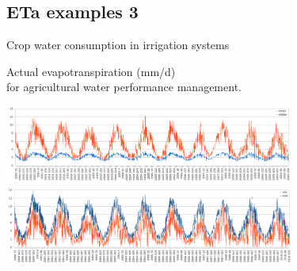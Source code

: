 \documentclass[xcolor=dvipsnames,beamer]{beamer} %
\begin{document}
\subsection{ETa examples 3}
\begin{frame}[fragile]{Crop water consumption in irrigation systems}

Actual evapotranspiration (mm/d)\\ 
for agricultural water performance management.\\

\begin{center}
 \includegraphics[width=9.5cm]{ciameanet}\\
 \includegraphics[width=9.5cm]{ciaminmaxet}
\end{center}

\end{frame}
\end{document}
